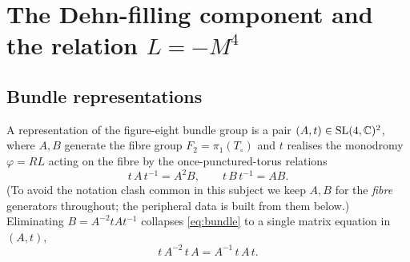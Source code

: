 \section{The Dehn-filling component and the relation $L=-M^4$}
\label{sec:dehn}

\subsection{Bundle representations} A representation of the figure-eight bundle group is a pair
$(A,t)\in\mathrm{SL}(4,\mathbb{C})^2$, where $A,B$ generate the fibre group $F_2=\pi_1(T_\circ)$ and $t$ realises the
monodromy $\varphi=RL$ acting on the fibre by the once-punctured-torus relations
\begin{equation}\label{eq:bundle}
  t\,A\,t^{-1}=A^2B,\qquad t\,B\,t^{-1}=AB.
\end{equation}
(To avoid the notation clash common in this subject we keep $A,B$ for the \emph{fibre} generators
throughout; the peripheral data is built from them below.) Eliminating $B=A^{-2}tAt^{-1}$ collapses
\eqref{eq:bundle} to a single matrix equation in $(A,t)$,
\begin{equation}\label{eq:star}
  t\,A^{-2}\,t\,A=A^{-1}\,t\,A\,t.
\end{equation}

